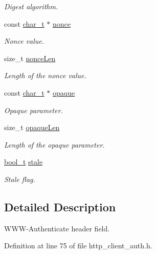 \begin{DoxyCompactItemize}
\begin{DoxyCompactList}\small\item\em Digest algorithm. \end{DoxyCompactList}\item 
const \hyperlink{compiler__port_8h_a40bb5262bf908c328fbcfbe5d29d0201}{char\+\_\+t} $\ast$ \hyperlink{structHttpWwwAuthenticateHeader_a6affcd43ab95104141feb6e942cfa847}{nonce}
\begin{DoxyCompactList}\small\item\em Nonce value. \end{DoxyCompactList}\item 
size\+\_\+t \hyperlink{structHttpWwwAuthenticateHeader_a0a7963450e6d9edfc3328f818b059a42}{nonce\+Len}
\begin{DoxyCompactList}\small\item\em Length of the nonce value. \end{DoxyCompactList}\item 
const \hyperlink{compiler__port_8h_a40bb5262bf908c328fbcfbe5d29d0201}{char\+\_\+t} $\ast$ \hyperlink{structHttpWwwAuthenticateHeader_ae28609cd57840a3be9b40abc0f046e58}{opaque}
\begin{DoxyCompactList}\small\item\em Opaque parameter. \end{DoxyCompactList}\item 
size\+\_\+t \hyperlink{structHttpWwwAuthenticateHeader_a46dd608310782f859a06434c6ebb7911}{opaque\+Len}
\begin{DoxyCompactList}\small\item\em Length of the opaque parameter. \end{DoxyCompactList}\item 
\hyperlink{compiler__port_8h_a812d16e5494522586b3784e55d479912}{bool\+\_\+t} \hyperlink{structHttpWwwAuthenticateHeader_aa2703d9b83c9c45022f3eb3476d07ffd}{stale}
\begin{DoxyCompactList}\small\item\em Stale flag. \end{DoxyCompactList}\end{DoxyCompactItemize}


\subsection{Detailed Description}
W\+W\+W-\/\+Authenticate header field. 

Definition at line 75 of file http\+\_\+client\+\_\+auth.\+h.



